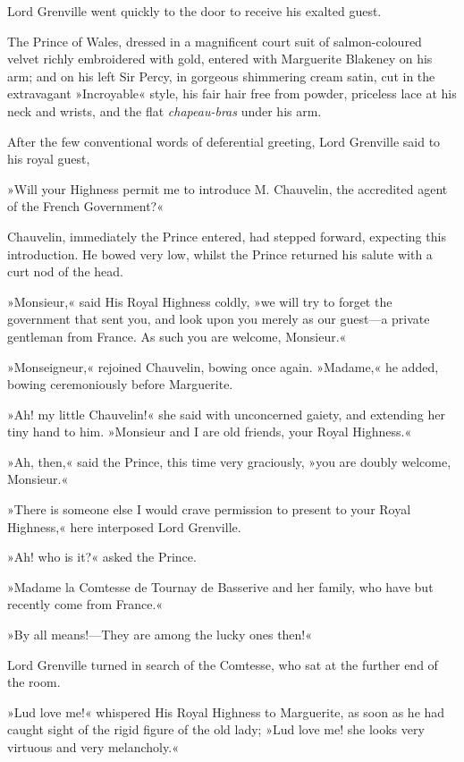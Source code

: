 Lord Grenville went quickly to the door to receive his exalted guest.

The Prince of Wales, dressed in a magnificent court suit of salmon-coloured velvet richly embroidered with gold, entered with Marguerite Blakeney on his arm; and on his left Sir Percy, in gorgeous shimmering cream satin, cut in the extravagant »Incroyable« style, his fair hair free from powder, priceless lace at his neck and wrists, and the flat \textit{chapeau-bras} under his arm.

After the few conventional words of deferential greeting, Lord Grenville said to his royal guest,\longdash


»Will your Highness permit me to introduce M. Chauvelin, the accredited agent of the French Government?«

Chauvelin, immediately the Prince entered, had stepped forward, expecting this introduction. He bowed very low, whilst the Prince returned his salute with a curt nod of the head.

»Monsieur,« said His Royal Highness coldly, »we will try to forget the government that sent you, and look upon you merely as our guest\allowbreak---\allowbreak a private gentleman from France. As such you are welcome, Monsieur.«

»Monseigneur,« rejoined Chauvelin, bowing once again. »Madame,« he added, bowing ceremoniously before Marguerite.

»Ah! my little Chauvelin!« she said with unconcerned gaiety, and extending her tiny hand to him. »Monsieur and I are old friends, your Royal Highness.«

»Ah, then,« said the Prince, this time very graciously, »you are doubly welcome, Monsieur.«

»There is someone else I would crave permission to present to your Royal Highness,« here interposed Lord Grenville.

»Ah! who is it?« asked the Prince.

»Madame la Comtesse de Tournay de Basserive and her family, who have but recently come from France.«

»By all means!\allowbreak---\allowbreak They are among the lucky ones then!«

Lord Grenville turned in search of the Comtesse, who sat at the further end of the room.

»Lud love me!« whispered His Royal Highness to Marguerite, as soon as he had caught sight of the rigid figure of the old lady; »Lud love me! she looks very virtuous and very melancholy.«


